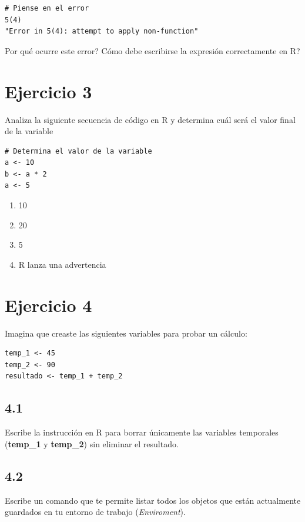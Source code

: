 \documentclass{article}
\begin{document}
\begin{verbatim}
# Piense en el error
5(4)
"Error in 5(4): attempt to apply non-function"
\end{verbatim}

\textquestiondown Por qué ocurre este error? \textquestiondown Cómo 
debe escribirse la expresión correctamente en R?


\section*{Ejercicio 3}
Analiza la siguiente secuencia de código en R y determina cuál será 
el valor final de la variable

\begin{verbatim}
# Determina el valor de la variable
a <- 10
b <- a * 2
a <- 5
\end{verbatim}

\begin{enumerate}[label=\alph*]
    \item 10
    \item 20
    \item 5
    \item R lanza una advertencia
\end{enumerate}

\section*{Ejercicio 4}
Imagina que creaste las siguientes variables para probar un cálculo: 

\begin{verbatim}
temp_1 <- 45
temp_2 <- 90
resultado <- temp_1 + temp_2
\end{verbatim}

\subsection*{4.1}
Escribe la instrucción en R para borrar únicamente las variables 
temporales (\textbf{temp\_1} y \textbf{temp\_2}) sin eliminar el resultado. 

\subsection*{4.2}
Escribe un comando que te permite listar todos los objetos que están 
actualmente guardados en tu entorno de trabajo (\textit{Enviroment}).
\end{document}
